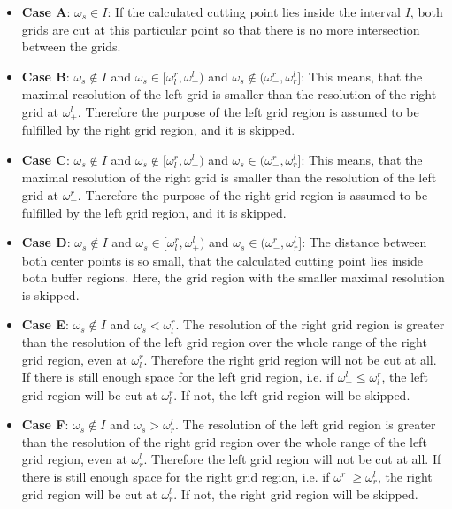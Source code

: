 \begin{itemize} %
	\item{\bf Case A}: $\omega_s \in I$: If the calculated cutting point lies inside the interval $I$, both grids are cut at this particular point so that there is no more intersection between the grids.

	\item{\bf Case B}: $\omega_s \notin I$ and $\omega_s \in [\omega_l^r, \omega_+^l)$ and $\omega_s \notin (\omega_-^r, \omega_r^l]$: This means, that the maximal resolution of the left grid is smaller than the resolution of the right grid at $\omega_+^l$. Therefore the purpose of the left grid region is assumed to be fulfilled by the right grid region, and it is skipped.

	\item{\bf Case C}: $\omega_s \notin I$ and $\omega_s \notin [\omega_l^r, \omega_+^l)$ and $\omega_s \in (\omega_-^r, \omega_r^l]$: This means, that the maximal resolution of the right grid is smaller than the resolution of the left grid at $\omega_-^r$. Therefore the purpose of the right grid region is assumed to be fulfilled by the left grid region, and it is skipped.

	\item{\bf Case D}: $\omega_s \notin I$ and $\omega_s \in [\omega_l^r, \omega_+^l)$ and $\omega_s \in (\omega_-^r, \omega_r^l]$: The distance between both center points is so small, that the calculated cutting point lies inside both buffer regions. Here, the grid region with the smaller maximal resolution is skipped.

	\item{\bf Case E}:  $\omega_s \notin I$ and $\omega_s < \omega_l^r$. The resolution of the right grid region is greater than the resolution of the left grid region over the whole range of the right grid region, even at $\omega_l^r$. Therefore the right grid region will not be cut at all. If there is still enough space for the left grid region, i.e. if $\omega_+^l\leq\omega_l^r$, the left grid region will be cut at $\omega_l^r$. If not, the left grid region will be skipped.

	\item{\bf Case F}:  $\omega_s \notin I$ and $\omega_s > \omega_r^l$. The resolution of the left grid region is greater than the resolution of the right grid region over the whole range of the left grid region, even at $\omega_r^l$. Therefore the left grid region will not be cut at all. If there is still enough space for the right grid region, i.e. if $\omega_-^r \geq \omega_r^l$, the right grid region will be cut at $\omega_r^l$. If not, the right grid region will be skipped.
\end{itemize}

